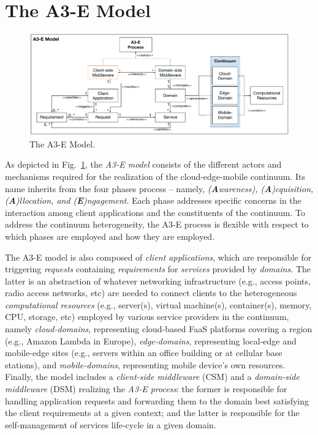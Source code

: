 \section{The A3-E Model}\label{sec:proposal}

\begin{figure}[tbp]
	\includegraphics[width=1\textwidth]{figs/A3-E-model.pdf}
	\caption{The A3-E Model.}
	\label{fig:A3-E-model}
\end{figure}

As depicted in Fig.~\ref{fig:A3-E-model}, the \textit{A3-E model} consists of the different actors and mechanisms required for the realization of the cloud-edge-mobile continuum. Its name inherits from the four phases process -- namely, \textit{(\textbf{A}wareness), (\textbf{A})cquisition, (\textbf{A})llocation, and (\textbf{E})ngagement}. Each phase addresses specific concerns in the interaction among client applications and the constituents of the continuum. To address the continuum heterogeneity, the A3-E process is flexible with respect to which phases are employed and how they are employed.

The A3-E model is also composed of \textit{client applications}, which are responsible for triggering \textit{requests} containing \textit{requirements} for  \textit{services} provided by \textit{domains}. The latter is an abstraction of whatever networking infrastructure (e.g., access points, radio access networks, etc) are needed to connect clients to the heterogeneous \textit{computational resources} (e.g., server(s), virtual machine(s), container(s), memory, CPU, storage, etc) employed by various service providers in the continuum, namely \textit{cloud-domains}, representing cloud-based FaaS platforms covering a region (e.g., Amazon Lambda in Europe), \textit{edge-domains}, representing local-edge and mobile-edge sites (e.g., servers within an office building or at cellular base stations), and \textit{mobile-domains}, representing mobile device's own resources.
Finally, the model includes a \textit{client-side middleware} (CSM) and a \textit{domain-side middleware} (DSM) realizing the \textit{A3-E process}: the former is responsible for handling application requests and forwarding them to the domain best satisfying the client requirements at a given context; and the latter is responsible for the self-management of services life-cycle in a given domain. 

